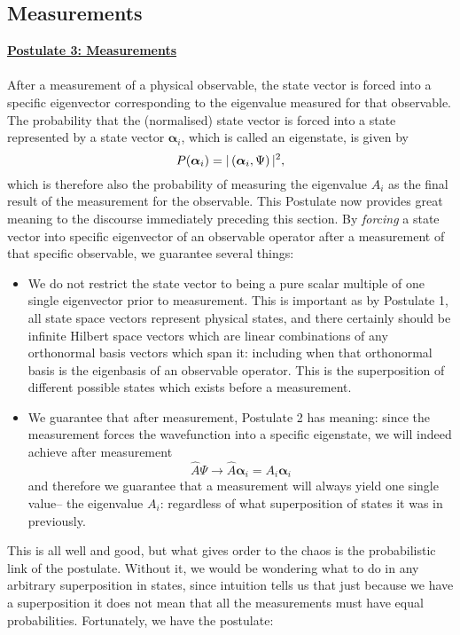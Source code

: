 \subsection{Measurements}
\Answer
\underline{\textbf{Postulate 3: Measurements}}\\\\
After a measurement of a physical observable, the state vector is forced into a specific eigenvector corresponding to the eigenvalue measured for that observable. The probability that the (normalised) state vector is forced into a state represented by a state vector $\bm{\alpha}_{i}$, which is called an eigenstate, is given by
$$
P(\bm{\alpha}_{i})=|\left(\bm{\alpha}_{i},\Psi\right)|^2,
$$
which is therefore also the probability of measuring the eigenvalue $A_{i}$ as the final result of the measurement for the observable.
\Answerend
This Postulate now provides great meaning to the discourse immediately preceding this section. By \textit{forcing} a state vector into specific eigenvector of an observable operator after a measurement of that specific observable, we guarantee several things:
\begin{itemize}
    \item We do not restrict the state vector to being a pure scalar multiple of one single eigenvector prior to measurement. This is important as by Postulate 1, all state space vectors represent physical states, and there certainly should be infinite Hilbert space vectors which are linear combinations of any orthonormal basis vectors which span it: including when that orthonormal basis is the eigenbasis of an observable operator. This is the superposition of different possible states which exists before a measurement.
    \item We guarantee that after measurement, Postulate 2 has meaning: since the measurement forces the wavefunction into a specific eigenstate, we will indeed achieve after measurement
    $$
    \hat{A}\Psi\to \hat{A}\bm{\alpha}_{i}=A_{i}\bm{\alpha}_{i}
    $$
    and therefore we guarantee that a measurement will always yield one single value-- the eigenvalue $A_{i}$: regardless of what superposition of states it was in previously. 
\end{itemize}
This is all well and good, but what gives order to the chaos is the probabilistic link of the postulate. Without it, we would be wondering what to do in any arbitrary superposition in states, since intuition tells us that just because we have a superposition it does not mean that all the measurements must have equal probabilities. Fortunately, we have the postulate:
